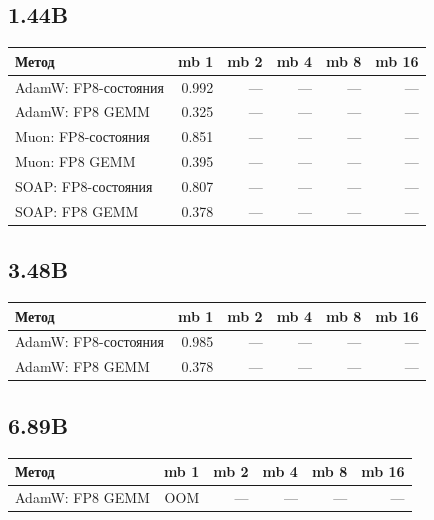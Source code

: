 \documentclass[10pt]{article}
\begin{document}
\subsection{1.44B}
\begin{center}
\small
\begin{tabular}{lrrrrr}
\toprule
\textbf{Метод} & \textbf{mb 1} & \textbf{mb 2} & \textbf{mb 4} & \textbf{mb 8} & \textbf{mb 16} \\
\midrule
AdamW: FP8-состояния & 0.992 & --- & --- & --- & --- \\
AdamW: FP8 GEMM & 0.325 & --- & --- & --- & --- \\
Muon: FP8-состояния & 0.851 & --- & --- & --- & --- \\
Muon: FP8 GEMM & 0.395 & --- & --- & --- & --- \\
SOAP: FP8-состояния & 0.807 & --- & --- & --- & --- \\
SOAP: FP8 GEMM & 0.378 & --- & --- & --- & --- \\
\bottomrule
\end{tabular}
\end{center}
\subsection{3.48B}
\begin{center}
\small
\begin{tabular}{lrrrrr}
\toprule
\textbf{Метод} & \textbf{mb 1} & \textbf{mb 2} & \textbf{mb 4} & \textbf{mb 8} & \textbf{mb 16} \\
\midrule
AdamW: FP8-состояния & 0.985 & --- & --- & --- & --- \\
AdamW: FP8 GEMM & 0.378 & --- & --- & --- & --- \\
\bottomrule
\end{tabular}
\end{center}
\subsection{6.89B}
\begin{center}
\small
\begin{tabular}{lrrrrr}
\toprule
\textbf{Метод} & \textbf{mb 1} & \textbf{mb 2} & \textbf{mb 4} & \textbf{mb 8} & \textbf{mb 16} \\
\midrule
AdamW: FP8 GEMM & \textcolor{oomgray}{OOM} & --- & --- & --- & --- \\
\bottomrule
\end{tabular}
\end{center}
\end{document}
